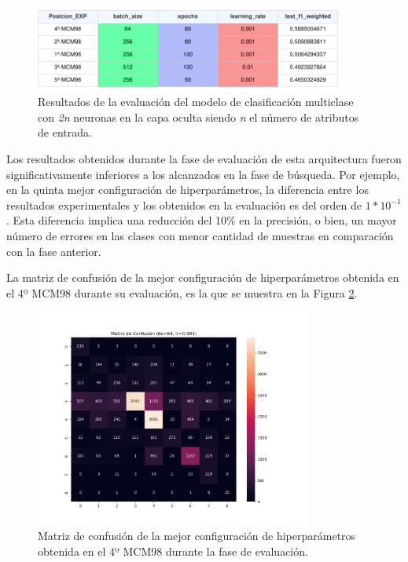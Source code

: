 \begin{figure}[H]
    \centering
    \includegraphics[width=0.9\textwidth]{./img/evaluacion/resultados/EVALMCM98.pdf}
    \caption{Resultados de la evaluación del modelo de clasificación multiclase con \textit{2n} neuronas en la capa oculta siendo \textit{n} el número de atributos de entrada.}
    \label{fig:EVALMCM98}
\end{figure}

Los resultados obtenidos durante la fase de evaluación de esta arquitectura fueron significativamente inferiores a los alcanzados en la fase de búsqueda. Por ejemplo, en la quinta mejor configuración de hiperparámetros, la diferencia entre los resultados experimentales y los obtenidos en la evaluación es del orden de $1*10^{-1}$. Esta diferencia implica una reducción del 10\% en la precisión, o bien, un mayor número de errores en las clases con menor cantidad de muestras en comparación con la fase anterior.


La matriz de confusión de la mejor configuración de hiperparámetros obtenida en el 4º MCM98 durante su evaluación, es la que se muestra en la Figura \ref{fig:MC_EVAL_MCM98}.

\begin{figure}[H]
    \centering
    \includegraphics[width=0.8\textwidth]{./img/evaluacion/matrices_confusion/MC_EVAL_MCM98.png}
    \caption{Matriz de confusión de la mejor configuración de hiperparámetros obtenida en el 4º MCM98 durante la fase de evaluación.}
    \label{fig:MC_EVAL_MCM98}
\end{figure}


